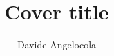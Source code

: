 \documentclass{beamer}
\title{Cover title}
\author{Davide Angelocola}
\begin{document}
\begin{frame} 
\titlepage
\end{frame}

\end{document}

